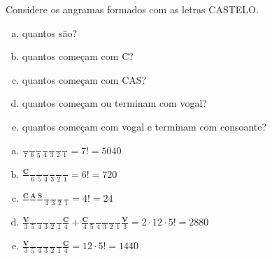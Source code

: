 \begin{ex}
 Considere os angramas formados com as letras CASTELO.
    \begin{enumerate}[(a)]
    \item quantos são?
    \item quantos começam com C?
    \item quantos começam com CAS?
    \item quantos começam ou terminam com vogal?
    \item quantos começam com vogal e terminam com consoante?
    \end{enumerate}
 \begin{sol}
     \phantom{A} 
  \begin{enumerate}[(a)]
      \item $\frac{\phantom{A}}{7}\frac{\phantom{A}}{6}\frac{\phantom{A}}{5}\frac{\phantom{A}}{4}\frac{\phantom{A}}{3}\frac{\phantom{A}}{2}\frac{\phantom{A}}{1}= 7!=5040$
      \item $\frac{\textbf{C}}{\phantom{A}}\frac{\phantom{A}}{6}\frac{\phantom{A}}{5}\frac{\phantom{A}}{4}\frac{\phantom{A}}{3}\frac{\phantom{A}}{2}\frac{\phantom{A}}{1}= 6!=720$
      \item $\frac{\textbf{C}}{\phantom{A}}\frac{\textbf{A}}{\phantom{A}}\frac{\textbf{S}}{\phantom{A}}\frac{\phantom{A}}{4}\frac{\phantom{A}}{3}\frac{\phantom{A}}{2}\frac{\phantom{A}}{1}= 4! = 24$
      \item $\frac{\textbf{V}}{3}\frac{\phantom{A}}{5}\frac{\phantom{A}}{4}\frac{\phantom{A}}{3}\frac{\phantom{A}}{2}\frac{\phantom{A}}{1}\frac{\textbf{C}}{4}+\frac{\textbf{C}}{4}\frac{\phantom{A}}{5}\frac{\phantom{A}}{4}\frac{\phantom{A}}{3}\frac{\phantom{A}}{2}\frac{\phantom{A}}{1}\frac{\textbf{V}}{3}= 2\cdot 12 \cdot 5! = 2880$
      \item $\frac{\textbf{V}}{3}\frac{\phantom{A}}{5}\frac{\phantom{A}}{4}\frac{\phantom{A}}{3}\frac{\phantom{A}}{2}\frac{\phantom{A}}{1}\frac{\textbf{C}}{4}= 12 \cdot 5! = 1440$
  \end{enumerate}
 \end{sol}
\end{ex}